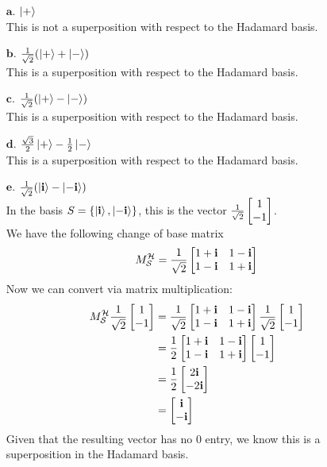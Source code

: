 \documentclass[11pt]{article}
\def\bfi{\ensuremath\textbf{i}}
\def\srtt{\ensuremath\frac{1}{\sqrt{2}}}
\begin{document}
\begin{enumerate}
\item[$\textbf{a.}$] $\ket{+}$ \\
	This is not a superposition with respect to the Hadamard basis. 
\item[$\textbf{b.}$] $\srtt(\ket{+} + \ket{-})$ \\
	This is a superposition with respect to the Hadamard basis.
\item[$\textbf{c.}$] $\srtt(\ket{+} - \ket{-})$ \\
	This is a superposition with respect to the Hadamard basis.
\item[$\textbf{d.}$] $\frac{\sqrt{3}}{2}\ket{+} - \frac{1}{2}\ket{-}$ \\
	This is a superposition with respect to the Hadamard basis.
\item[$\textbf{e.}$] $\srtt(\ket{\bfi} - \ket{-\bfi})$ \\
	In the basis $S = \{\ket{\bfi}, \ket{-\bfi}\}$, this is the vector $\srtt\begin{bmatrix}1\\-1\end{bmatrix}$. \\
	We have the following change of base matrix 
		$$M^{\mathcal{H}}_{\mathcal{S}} = \srtt\begin{bmatrix}1 + \bfi & 1 - \bfi \\ 1 - \bfi & 1 + \bfi\end{bmatrix}$$
	Now we can convert via matrix multiplication:
	\begin{align*}
	M^{\mathcal{H}}_{\mathcal{S}}\srtt\begin{bmatrix}1\\-1\end{bmatrix} 
		&= \srtt\begin{bmatrix}1 + \bfi & 1 - \bfi \\ 1 - \bfi & 1 + \bfi\end{bmatrix}\srtt\begin{bmatrix}1\\-1\end{bmatrix} \\
		&= \frac{1}{2} \begin{bmatrix}1 + \bfi & 1 - \bfi \\ 1 - \bfi & 1 + \bfi\end{bmatrix}\begin{bmatrix}1\\-1\end{bmatrix} \\
		&= \frac{1}{2}\begin{bmatrix}2\bfi \\ -2\bfi  \end{bmatrix}  \\
		&= \begin{bmatrix}\bfi \\ -\bfi  \end{bmatrix} 
	\end{align*}
	Given that the resulting vector has no 0 entry, we know this is a superposition in the Hadamard basis.


\end{enumerate}
\end{document}
